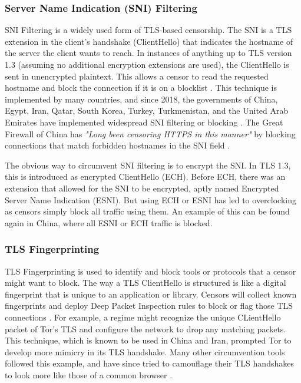 \subsubsection{Server Name Indication (SNI) Filtering}

SNI Filtering is a widely used form of TLS-based censorship. The SNI is a TLS extension in the client's handshake (ClientHello) that indicates the hostname of the server the client wants to reach. In instances of anything up to TLS version 1.3 (assuming no additional encryption extensions are used), the ClientHello is sent in unencrypted plaintext. This allows a censor to read the requested hostname and block the connection if it is on a blocklist \cite{SNIUnencryptedCloudFlare}. This technique is implemented by many countries, and since 2018, the governments of China, Egypt, Iran, Qatar, South Korea, Turkey, Turkmenistan, and the United Arab Emirates have implemented widespread SNI filtering or blocking \cite{rfc9505SNIBlocking}. The Great Firewall of China has \textit{"Long been censoring HTTPS in this manner"} by blocking connections that match forbidden hostnames in the SNI field \cite{GreatFirewallSNI}. 

The obvious way to circumvent SNI filtering is to encrypt the SNI. In TLS 1.3, this is introduced as encrypted ClientHello (ECH). Before ECH, there was an extension that allowed for the SNI to be encrypted, aptly named Encrypted Server Name Indication (ESNI). But using ECH or ESNI has led to overclocking as censors simply block all traffic using them. An example of this can be found again in China, where all ESNI or ECH traffic is blocked.

\subsubsection{TLS Fingerprinting}

TLS Fingerprinting is used to identify and block tools or protocols that a censor might want to block. The way a TLS ClientHello is structured is like a digital fingerprint that is unique to an application or library. Censors will collect known fingerprints and deploy Deep Packet Inspection rules to block or flag those TLS connections \cite{TLSFingerprinting}. For example, a regime might recognize the unique CLientHello packet of Tor's TLS and configure the network to drop any matching packets. This technique, which is known to be used in China and Iran, prompted Tor to develop more mimicry in its TLS handshake. Many other circumvention tools followed this example, and have since tried to camouflage their TLS handshakes to look more like those of a common browser \cite{TLSFingerprinting}.

